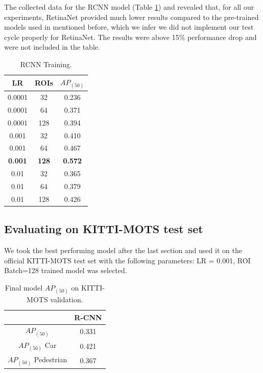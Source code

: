 \documentclass[11pt,a4paper,twocolumn,twoside]{article}
\begin{document}
The collected data for the RCNN model (Table \ref{table:RCNN_Table_training}) and revealed that, for all our experiments, RetinaNet provided much lower results compared to the pre-trained models used in mentioned before, which we infer we did not implement our test cycle properly for RetinaNet. The results were above 15\% performance drop and were not included in the table.

\begin{table}[ht]
    \centering
    \begin{tabular}{|c | c || c|} 
        \hline
        \textbf{LR} & \textbf{ROIs} & \textbf{$AP_{(50)}$} \\ [0.8ex] 
            \hline
            0.0001 & 32 & 0.236 \\ 
            \hline
            0.0001 & 64 & 0.371\\ 
            \hline
            0.0001 & 128 & 0.394 \\ 
            \hline
            0.001 & 32 & 0.410\\ 
            \hline
            0.001 & 64 & 0.467\\ 
            \hline
            \textbf{0.001} & \textbf{128} & \textbf{0.572}\\ 
            \hline
            0.01 & 32 & 0.365\\ 
            \hline
            0.01 & 64 & 0.379\\ 
            \hline
            0.01 & 128 & 0.426\\ 
         \hline
    \end{tabular}
    \caption{\label{table:RCNN_Table_training}RCNN Training.}
\end{table}

\subsection{Evaluating on KITTI-MOTS test set}

We took the best performing model after the last section and used it on the official KITTI-MOTS test set with the following parameters: LR = 0.001, ROI Batch=128 trained model was selected. 


\begin{table}[ht]
    \centering
    \begin{tabular}{|c || c |} 
        \hline
          & \textbf{R-CNN}\\ [0.8ex] 
          \hline
         $AP_{(50)}$ & 0.331\\ 
         \hline
         $AP_{(50)}$ Car & 0.421\\
         \hline
         $AP_{(50)}$ Pedestrian & 0.367\\
         \hline
    \end{tabular}
    \caption{\label{table:KITTI-MOTS-FINAL}Final model $AP_{(50)}$ on KITTI-MOTS validation.}
\end{table}
\end{document}
